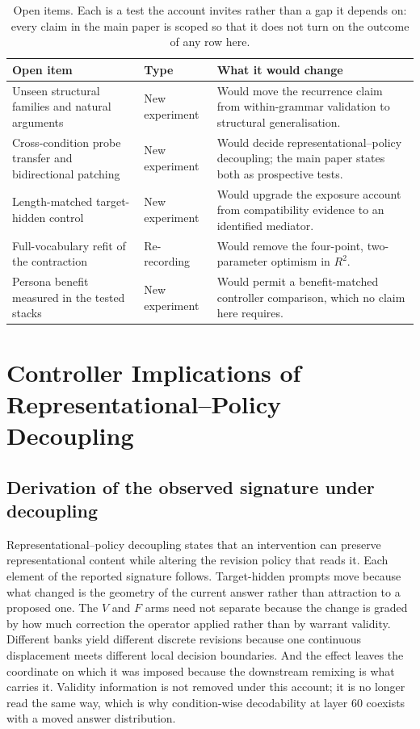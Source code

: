\documentclass[letterpaper]{article}
\begin{document}
\begin{table}[t]
\centering
\small
\begin{tabularx}{\textwidth}{@{}L{4.6cm}L{2.4cm}Y@{}}
\toprule
Open item & Type & What it would change \\
\midrule
Unseen structural families and natural arguments & New experiment & Would move the recurrence claim from within-grammar validation to structural generalisation. \\
Cross-condition probe transfer and bidirectional patching & New experiment & Would decide representational--policy decoupling; the main paper states both as prospective tests. \\
Length-matched target-hidden control & New experiment & Would upgrade the exposure account from compatibility evidence to an identified mediator. \\
Full-vocabulary refit of the contraction & Re-recording & Would remove the four-point, two-parameter optimism in $R^{2}$. \\
Persona benefit measured in the tested stacks & New experiment & Would permit a benefit-matched controller comparison, which no claim here requires. \\
\bottomrule
\end{tabularx}
\caption{Open items. Each is a test the account invites rather than a gap it depends on: every claim in the main paper is scoped so that it does not turn on the outcome of any row here.}
\label{tab:supp-open}
\end{table}

\section{Controller Implications of Representational--Policy Decoupling}
\label{supp:controller}

\subsection{Derivation of the observed signature under decoupling}

Representational--policy decoupling states that an intervention can preserve representational content while altering the revision policy that reads it. Each element of the reported signature follows. Target-hidden prompts move because what changed is the geometry of the current answer rather than attraction to a proposed one. The $V$ and $F$ arms need not separate because the change is graded by how much correction the operator applied rather than by warrant validity. Different banks yield different discrete revisions because one continuous displacement meets different local decision boundaries. And the effect leaves the coordinate on which it was imposed because the downstream remixing is what carries it. Validity information is not removed under this account; it is no longer read the same way, which is why condition-wise decodability at layer 60 coexists with a moved answer distribution.
\end{document}
